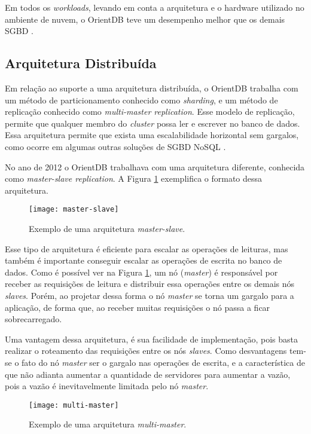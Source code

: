 	Em todos os \textit{workloads}, levando em conta a arquitetura e o hardware utilizado no ambiente de nuvem, o OrientDB teve um desempenho melhor que os demais SGBD \cite{dayarathna2012xgdbench}.
	
	
\subsection{Arquitetura Distribuída} \label{orient_distributed}
	Em relação ao suporte a uma arquitetura distribuída, o OrientDB trabalha com um método de particionamento conhecido como \textit{sharding}, e um método de replicação conhecido como \textit{multi-master replication}. Esse modelo de replicação, permite que qualquer membro do \textit{cluster} possa ler e escrever no banco de dados. Essa arquitetura permite que exista uma escalabilidade horizontal sem gargalos, como ocorre em algumas outras soluções de SGBD NoSQL \cite{kauremerging}.
	
	No ano de 2012 o OrientDB trabalhava com uma arquitetura diferente, conhecida como \textit{master-slave replication}. A Figura \ref{fig:master-slave} exemplifica o formato dessa arquitetura.
	
\begin{figure}[h]
	\centering
    \texttt{[image: master-slave]}
    \caption{Exemplo de uma arquitetura \textit{master-slave}.}
    \label{fig:master-slave}
\end{figure}

	Esse tipo de arquitetura é eficiente para escalar as operações de leituras, mas também é importante conseguir escalar as operações de escrita no banco de dados. Como é possível ver na Figura \ref{fig:master-slave}, um nó (\textit{master}) é responsável por receber as requisições de leitura e distribuir essa operações entre os demais nós \textit{slaves}. Porém, ao projetar dessa forma o nó \textit{master} se torna um gargalo para a aplicação, de forma que, ao receber muitas requisições o nó passa a ficar sobrecarregado.
	
	Uma vantagem dessa arquitetura, é sua facilidade de implementação, pois basta realizar o roteamento das requisições entre os nós \textit{slaves}. Como desvantagens tem-se o fato do nó \textit{master} ser o gargalo nas operações de escrita, e a característica de que não adianta aumentar a quantidade de servidores para aumentar a vazão, pois a vazão é inevitavelmente limitada pelo nó \textit{master}.
	
\begin{figure}[h]
	\centering
    \texttt{[image: multi-master]}
    \caption{Exemplo de uma arquitetura \textit{multi-master}.}
    \label{fig:multi-master}
\end{figure}
	
